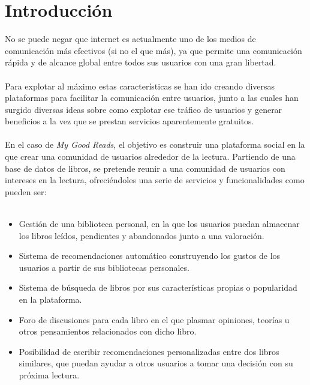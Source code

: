 \chapter{Introducción}

No se puede negar que internet es actualmente uno de los medios de comunicación más efectivos (si no el que más), ya que permite una comunicación rápida y de alcance global entre todos sus usuarios con una gran libertad.
\\\\
Para explotar al máximo estas características se han ido creando diversas plataformas para facilitar la comunicación entre usuarios, junto a las cuales han surgido diversas ideas sobre como explotar ese tráfico de usuarios y generar beneficios a la vez que se prestan servicios aparentemente gratuitos.
\\\\
En el caso de \textit{My Good Reads}, el objetivo es construir una plataforma social en la que crear una comunidad de usuarios alrededor de la lectura. Partiendo de una base de datos de libros, se pretende reunir a una comunidad de usuarios con intereses en la lectura, ofreciéndoles una serie de servicios y funcionalidades como pueden ser:
\\\\
\begin{itemize}
    \item Gestión de una biblioteca personal, en la que los usuarios puedan almacenar los libros leídos, pendientes y abandonados junto a una valoración.
    \item Sistema de recomendaciones automático construyendo los gustos de los usuarios a partir de sus bibliotecas personales.
    \item Sistema de búsqueda de libros por sus características propias o popularidad en la plataforma.
    \item Foro de discusiones para cada libro en el que plasmar opiniones, teorías u otros pensamientos relacionados con dicho libro.
    \item Posibilidad de escribir recomendaciones personalizadas entre dos libros similares, que puedan ayudar a otros usuarios a tomar una decisión con su próxima lectura.
\end{itemize}
